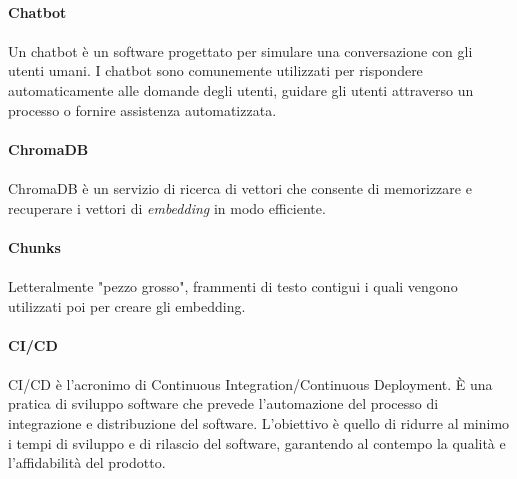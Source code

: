\documentclass[10pt, a4paper]{article}
\begin{document}
\vspace{2em}
\paragraph{Chatbot}\noindent\hrulefill
\paragraph{}Un chatbot è un software progettato per simulare una conversazione con gli utenti umani. I chatbot sono comunemente utilizzati per rispondere automaticamente alle domande degli utenti, guidare gli utenti attraverso un processo o fornire assistenza automatizzata.

\vspace{2em}
\paragraph{ChromaDB}\noindent\hrulefill
\paragraph{}ChromaDB è un servizio di ricerca di vettori che consente di memorizzare e recuperare i vettori di \textit{embedding\pg} in modo efficiente.

\vspace{2em}
\paragraph{Chunks}\noindent\hrulefill
\paragraph{}Letteralmente "pezzo grosso", frammenti di testo contigui i quali vengono utilizzati poi per creare gli embedding.

\vspace{2em}
\paragraph{CI/CD}\noindent\hrulefill\noindent\hrulefill
\paragraph{}CI/CD è l'acronimo di Continuous Integration/Continuous Deployment. È una pratica di sviluppo software che prevede l'automazione del processo di integrazione e distribuzione del software. L'obiettivo è quello di ridurre al minimo i tempi di sviluppo e di rilascio del software, garantendo al contempo la qualità e l'affidabilità del prodotto.
\end{document}
